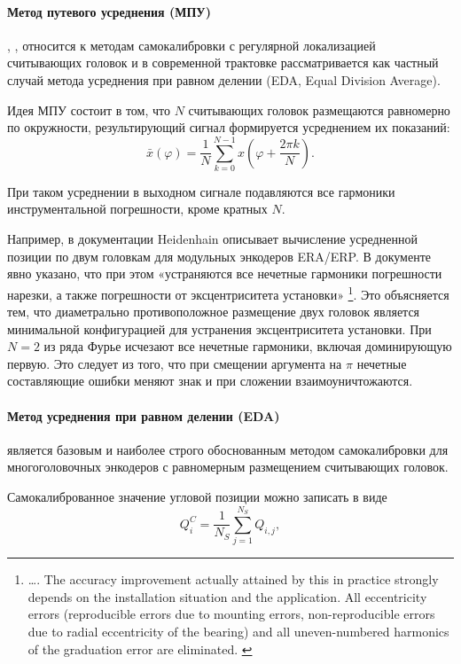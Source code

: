 \paragraph{Метод путевого усреднения (МПУ)}\label{par:avg_path_method} \cite{mpu-ionak}, \cite{mpu-bachish}, \cite{cramer} относится к методам самокалибровки с регулярной локализацией считывающих головок и в современной трактовке рассматривается как частный случай метода усреднения при равном делении (EDA, Equal Division Average).

Идея МПУ состоит в том, что $N$ считывающих головок размещаются равномерно по окружности, результирующий сигнал формируется усреднением их показаний:
$$
\bar{x}(\varphi)
=
\frac{1}{N}
\sum_{k=0}^{N-1}
x\!\left(\varphi + \frac{2\pi k}{N}\right).
$$

При таком усреднении в выходном сигнале подавляются все гармоники инструментальной погрешности, кроме кратных $N$.

Например, в документации \cite{heidenhain-modular-angle-encoders} Heidenhain описывает вычисление усредненной позиции по двум  головкам для модульных энкодеров ERA/ERP. В документе явно указано, что при этом «устраняются все нечетные гармоники погрешности нарезки, а также погрешности от эксцентриситета установки» \footnote{\dots. The accuracy improvement actually attained by this in practice strongly
depends on the installation situation and the application. All eccentricity errors (reproducible errors due to mounting errors,
non-reproducible errors due to radial eccentricity of the bearing) and all uneven-numbered harmonics of the graduation error are eliminated. \cite{heidenhain-modular-angle-encoders}}. Это объясняется тем, что диаметрально противоположное размещение двух головок является минимальной конфигурацией для устранения эксцентриситета установки. При $N = 2$ из ряда Фурье исчезают все нечетные гармоники, включая доминирующую первую. Это следует из того, что при смещении аргумента на $\pi$ нечетные составляющие ошибки меняют знак и при сложении взаимоуничтожаются. 

\paragraph{Метод усреднения при равном делении (EDA)} \cite{watanabe-eda} является базовым и наиболее строго обоснованным методом самокалибровки для многоголовочных энкодеров с равномерным размещением считывающих головок.

Самокалиброванное значение угловой позиции можно записать в виде
$$
Q_i^{C}
=
\frac{1}{N_S}
\sum_{j=1}^{N_S}
Q_{i,j},
$$

